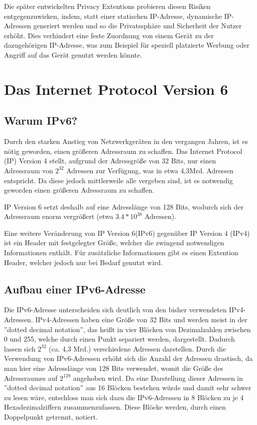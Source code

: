 \documentclass[a4paper, 12pt]{scrartcl}
\begin{document}
Die später entwickelten Privacy Extentions probieren diesen Risiken entgegenzuwirken, indem, statt einer statischen IP-Adresse, dynamische IP-Adressen generiert werden und so die Privatssphäre und Sicherheit der Nutzer erhöht.
Dies verhindert eine feste Zuordnung von einem Gerät zu der dazugehörigen IP-Adresse, was zum Beispiel für speziell platzierte Werbung oder Angriff auf das Gerät genutzt werden könnte.

\newpage

\section{Das Internet Protocol Version 6}
\subsection{Warum IPv6?}
Durch den starken Anstieg von Netzwerkgeräten in den vergangen Jahren, ist es nötig geworden, einen größeren Adressraum zu schaffen.
Das Internet Protocol (IP) Version 4 stellt, aufgrund der Adressgröße von 32 Bits, nur einen Adressraum von $2^{32}$ Adressen zur Verfügung, was in etwa 4,3Mrd. Adressen entspricht. Da diese jedoch mittlerweile alle vergeben sind, ist es notwendig geworden einen größeren Adressraum zu schaffen.


IP Version 6 setzt deshalb auf eine Adresslänge von 128 Bits, wodurch sich der Adressraum enorm vergrößert (etwa $3.4*10^{38}$ Adressen). 

Eine weitere Veränderung von IP Version 6(IPv6) gegenüber IP Version 4 (IPv4) ist ein Header mit festgelegter Größe, welcher die zwingend notwendigen Informationen enthält. Für zusätzliche Informationen gibt es einen Extention Header, welcher jedoch nur bei Bedarf genutzt wird.

\subsection{Aufbau einer IPv6-Adresse}
Die IPv6-Adresse unterscheiden sich deutlich von den bisher verwendeten IPv4-Adressen. IPv4-Adressen haben eine Größe von 32 Bits und werden meist in der ''dotted decimal notation'', das heißt in vier Blöcken von Dezimalzahlen zwischen 0 und 255, welche durch einen Punkt separiert werden, dargestellt. Dadurch lassen sich $2^{32}$ (ca. 4,3 Mrd.) verschiedene Adressen darstellen.
Durch die Verwendung von IPv6-Adressen erhöht sich die Anzahl der Adressen drastisch, da man hier eine Adresslänge von 128 Bits verwendet, womit die Größe des Adressraumes auf $2^{128}$ angehoben wird. Da eine Darstellung dieser Adressen in ''dotted decimal notation'' aus 16 Blöcken bestehen würde und damit sehr schwer zu lesen wäre, entschloss man sich dazu die IPv6-Adressen in 8 Blöcken zu je 4 Hexadezimalziffern zusammenzufassen. Diese Blöcke werden, durch einen Doppelpunkt getrennt, notiert.
\end{document}
